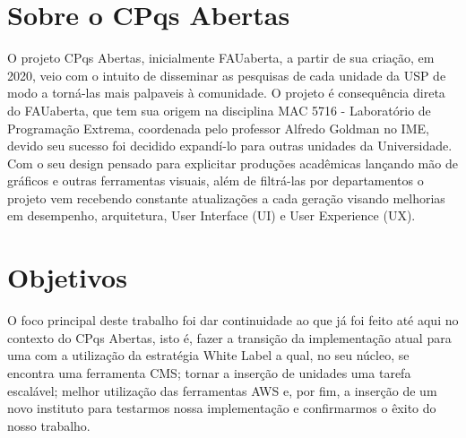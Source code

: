 \section{Sobre o CPqs Abertas}

O projeto CPqs Abertas, inicialmente FAUaberta, a partir de sua criação, em 2020, veio com o intuito de disseminar as pesquisas de cada unidade da USP de modo a torná-las mais palpaveis à comunidade. O projeto é consequência direta do FAUaberta, que tem sua origem na disciplina  MAC 5716 - Laboratório de Programação Extrema, coordenada pelo professor Alfredo Goldman no IME, devido seu sucesso foi decidido expandí-lo para outras unidades da Universidade. Com o seu design pensado para explicitar produções acadêmicas lançando mão de gráficos e outras ferramentas visuais, além de filtrá-las por departamentos o projeto vem recebendo constante atualizações a cada geração visando melhorias em desempenho, arquitetura, User Interface (UI) e User Experience (UX).

\section{Objetivos}

O foco principal deste trabalho foi dar continuidade ao que já foi feito até aqui no contexto do CPqs Abertas, isto é, fazer a transição da implementação atual para uma com a utilização da estratégia White Label a qual, no seu núcleo, se encontra uma ferramenta CMS; tornar a inserção de unidades uma tarefa escalável; melhor utilização das ferramentas AWS e, por fim, a inserção de um novo instituto para testarmos nossa implementação e confirmarmos o êxito do nosso trabalho.

